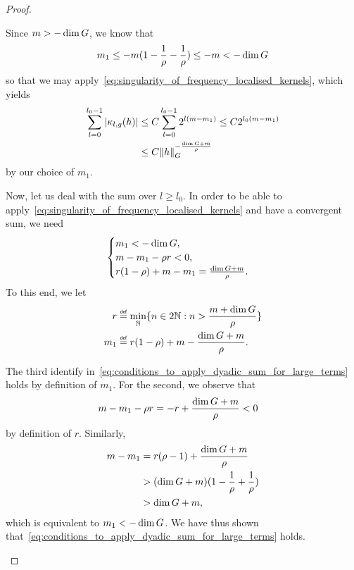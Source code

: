 \begin{proof}
\begin{description}
            Since $m > -\dim \Group$, we know that
            \begin{align*}
                m_1 \leq -m(1 - \frac 1 \rho - \frac 1 \rho) \leq -m < -\dim \Group
            \end{align*}
            so that we may apply~\eqref{eq:singularity_of_frequency_localised_kernels},
            which yields
            \begin{align*}
                \sum_{l = 0}^{l_0 - 1} \abs{\kappa_{l, g}(h)} &\leq C \sum_{l = 0}^{l_0 - 1} 2^{l(m - m_1)} \leq C 2^{l_0(m - m_1)}\\
                &\leq C \norm [\Group] h^{-\frac {\dim \Group + m} \rho}
            \end{align*}
            by our choice of $m_1$.

            Now, let us deal with the sum over $l \geq l_0$.
            In order to be able to apply~\eqref{eq:singularity_of_frequency_localised_kernels} and have a convergent sum,
            we need
            \begin{align}
                \begin{cases}
                    m_1 < -\dim \Group,\\
                    m - m_1 - \rho r < 0,\\
                    r(1 - \rho) + m - m_1 = \frac{\dim \Group + m} \rho.
                \end{cases}
                \label{eq:conditions_to_apply_dyadic_sum_for_large_terms}
            \end{align}
            To this end,
            we let
            \begin{align*}
                r &\defeq \min_{\N} \{n \in 2 \N : n > {\frac {m + \dim \Group} \rho}\}\\
                m_1 &\defeq r(1 - \rho) + m - \frac{\dim \Group + m} \rho.
            \end{align*}

            The third identify in~\eqref{eq:conditions_to_apply_dyadic_sum_for_large_terms} holds by definition of $m_1$.
            For the second, we observe that
            \begin{align*}
                m - m_1 - \rho r
                &= - r + \frac{\dim \Group + m} \rho < 0
            \end{align*}
            by definition of $r$.
            Similarly,
            \begin{align*}
                m - m_1
                &= r(\rho - 1) + \frac{\dim \Group + m} \rho\\
                &> (\dim \Group + m) (1 - \frac 1 \rho + \frac 1 \rho)\\
                &> \dim \Group + m,
            \end{align*}
            which is equivalent to $m_1 < - \dim \Group$.
            We have thus shown that~\eqref{eq:conditions_to_apply_dyadic_sum_for_large_terms} holds.


\end{description}
\end{proof}
